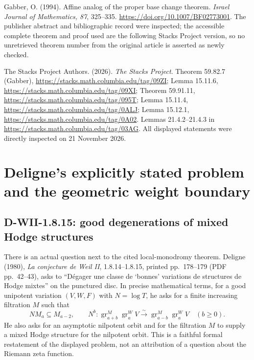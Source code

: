 \documentclass[11pt,a4paper]{article}
\theoremstyle{definition}\newtheorem{definition}[theorem]{Definition}
\theoremstyle{remark}\newtheorem{remark}[theorem]{Remark}
\begin{document}
Gabber, O. (1994). Affine analog of the proper base change theorem.
\emph{Israel Journal of Mathematics, 87}, 325--335.
\url{https://doi.org/10.1007/BF02773001}.
The publisher abstract and bibliographic record were inspected;
the accessible complete theorem and proof used are the following
Stacks Project version, so no unretrieved theorem number from the
original article is asserted as newly checked.

The Stacks Project Authors. (2026). \emph{The Stacks Project}.
Theorem 59.82.7 (Gabber), \url{https://stacks.math.columbia.edu/tag/09ZI};
Lemma 15.11.6, \url{https://stacks.math.columbia.edu/tag/09XI};
Theorem 59.91.11, \url{https://stacks.math.columbia.edu/tag/095T};
Lemma 15.11.4, \url{https://stacks.math.columbia.edu/tag/0ALJ};
Lemma 15.12.1, \url{https://stacks.math.columbia.edu/tag/0A02}.
Lemmas 21.4.2--21.4.3 in \url{https://stacks.math.columbia.edu/tag/03AG}.
All displayed statements were directly inspected on 21 November 2026.


\section{Deligne's explicitly stated problem and the geometric weight boundary}
\label{sec:deligne-problem}

\subsection{D-WII-1.8.15: good degenerations of mixed Hodge structures}

There is an actual question next to the cited local-monodromy theorem.
Deligne (1980), \emph{La conjecture de Weil II}, 1.8.14--1.8.15,
printed pp.~178--179 (PDF pp.~42--43), asks to
``D\'egager une classe de `bonnes' variations de structures de Hodge mixtes''
on the punctured disc. In precise mathematical terms, for a good
unipotent variation $(V,W,F)$ with $N=\log T$, he asks for a finite
increasing filtration $M$ such that
\[
 NM_a\subseteq M_{a-2},\qquad
 N^b:\operatorname{gr}^{M}_{a+b}\operatorname{gr}^{W}_a V
       \xrightarrow{\sim}
       \operatorname{gr}^{M}_{a-b}\operatorname{gr}^{W}_a V
 \quad(b\geq0).
\]
He also asks for an asymptotic nilpotent orbit and for the filtration
$M$ to supply a mixed Hodge structure for the nilpotent orbit.
This is a faithful formal restatement of the displayed problem, not
an attribution of a question about the Riemann zeta function.
\end{document}
